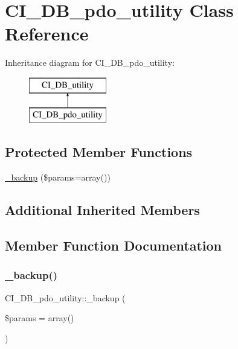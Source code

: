 \hypertarget{class_c_i___d_b__pdo__utility}{}\section{C\+I\+\_\+\+D\+B\+\_\+pdo\+\_\+utility Class Reference}
\label{class_c_i___d_b__pdo__utility}
Inheritance diagram for C\+I\+\_\+\+D\+B\+\_\+pdo\+\_\+utility\+:\begin{figure}[H]
\begin{center}
\leavevmode
\includegraphics[height=2.000000cm]{class_c_i___d_b__pdo__utility}
\end{center}
\end{figure}
\subsection*{Protected Member Functions}
\begin{DoxyCompactItemize}
\item 
\mbox{\hyperlink{class_c_i___d_b__pdo__utility_a55cc7c0e10ebe8d674e773a4c12da730}{\+\_\+backup}} (\$params=array())
\end{DoxyCompactItemize}
\subsection*{Additional Inherited Members}


\subsection{Member Function Documentation}
\mbox{\label{class_c_i___d_b__pdo__utility_a55cc7c0e10ebe8d674e773a4c12da730}} 
\subsubsection{\texorpdfstring{\+\_\+backup()}{\_backup()}}
{\footnotesize\ttfamily C\+I\+\_\+\+D\+B\+\_\+pdo\+\_\+utility\+::\+\_\+backup (\begin{DoxyParamCaption}\item[{}]{\$params = {\ttfamily array()} }\end{DoxyParamCaption})\hspace{0.3cm}{\ttfamily [protected]}}

